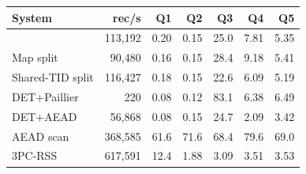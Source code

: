 \begin{tabular}{@{}lrrrrrr@{}}
\toprule
System & rec/s & Q1 & Q2 & Q3 & Q4 & Q5\\
\midrule
\textbf{\sys{}} & 113{,}192 & 0.20 & 0.15 & 25.0 & 7.81 & 5.35\\
Map split & 90{,}480 & 0.16 & 0.15 & 28.4 & 9.18 & 5.41\\
Shared-TID split & 116{,}427 & 0.18 & 0.15 & 22.6 & 6.09 & 5.19\\
\midrule
DET+Paillier & 220 & 0.08 & 0.12 & 83.1 & 6.38 & 6.49\\
DET+AEAD & 56{,}868 & 0.08 & 0.15 & 24.7 & 2.09 & 3.42\\
AEAD scan & 368{,}585 & 61.6 & 71.6 & 68.4 & 79.6 & 69.0\\
3PC-RSS & 617{,}591 & 12.4 & 1.88 & 3.09 & 3.51 & 3.53\\
\bottomrule
\end{tabular}
